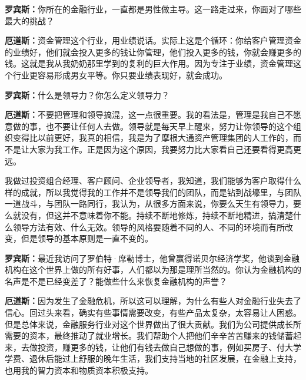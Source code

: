 \begin{BookQuote}
\textbf{罗宾斯：}你所在的金融行业，一直都是男性做主导。这一路走过来，你面对了哪些最大的挑战？
\end{BookQuote}

\begin{BookQuote}
\textbf{厄道斯：}资金管理这个行业，用业绩说话。实际上这是个循环：你给客户管理资金的业绩好，他们就会投入更多的钱让你管理，他们投入更多的钱，你就会赚更多的钱。这就是我从我奶奶那里学到的复利的巨大作用。因为专注于业绩，资金管理这个行业更容易形成男女平等。你只要业绩表现好，就会成功。
\end{BookQuote}

\begin{BookQuote}
\textbf{罗宾斯：}什么是领导力？你怎么定义领导力？
\end{BookQuote}

\begin{BookQuote}
\textbf{厄道斯：}不要把管理和领导搞混，这一点很重要。我的看法是，管理是我自己不愿意做的事，也不要让任何人去做。领导就是每天早上醒来，努力让你领导的这个组织变得比以前更好，我真的相信，我是为了摩根大通资产管理集团的人工作的，而不是让大家为我工作。正是因为这个原因，我要努力比大家看自己还要看得更高更远。
\end{BookQuote}

我做过投资组合经理、客户顾问、企业领导者，我知道，我们能够为客户取得什么样的成就，所以我觉得我的工作并不是领导我们的团队，而是钻到战壕里，与团队一道战斗，与团队一路同行，我认为，从很多方面来说，你要么天生有领导力，要么就没有，但这并不意味着你不能。持续不断地修炼，持续不断地精进，搞清楚什么领导方法有效、什么无效。领导的风格要随着不同的人、不同的环境而有所改变，但是领导的基本原则是一直不变的。

\begin{BookQuote}
\textbf{罗宾斯：}最近我访问了罗伯特·席勒博士，他曾赢得诺贝尔经济学奖，他谈到金融机构在这个世界上做的所有好事，人们都以为那是理所当然的。你认为金融机构的名声是不是已经变差了？能做些什么来恢复金融机构的声誉？
\end{BookQuote}

\begin{BookQuote}
\textbf{厄道斯：}因为发生了金融危机，所以这可以理解，为什么有些人对金融行业失去了信心。回过头来看，确实有些事情需要改变，有些产品太复杂，太容易让人困惑。但是总体来说，金融服务行业对这个世界做出了很大贡献。我们为公司提供成长所需要的资本，最终推动了就业增长。我们帮助个人把他们辛辛苦苦赚来的钱储蓄起来，去做投资，赚更多的钱，让他们有钱去做自己想做的事，例如买房子、付大学学费、退休后能过上舒服的晚年生活，我们支持当地的社区发展，在金融上支持，也用我的智力资本和物质资本积极支持。
\end{BookQuote}

